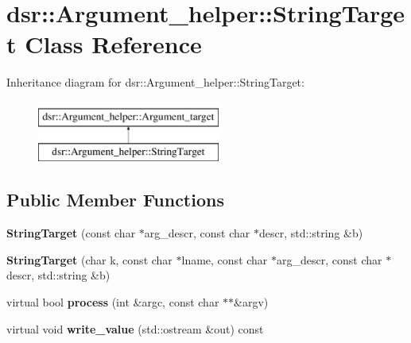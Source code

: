 \hypertarget{classdsr_1_1_argument__helper_1_1_string_target}{
\section{dsr::Argument\_\-helper::StringTarget Class Reference}
\label{classdsr_1_1_argument__helper_1_1_string_target}
}
Inheritance diagram for dsr::Argument\_\-helper::StringTarget:\begin{figure}[H]
\begin{center}
\leavevmode
\includegraphics[height=2.000000cm]{classdsr_1_1_argument__helper_1_1_string_target}
\end{center}
\end{figure}
\subsection*{Public Member Functions}
\begin{DoxyCompactItemize}
\item 
\hypertarget{classdsr_1_1_argument__helper_1_1_string_target_abbaf278629fe7019d9dd5018ab544b64}{
{\bfseries StringTarget} (const char $\ast$arg\_\-descr, const char $\ast$descr, std::string \&b)}
\label{classdsr_1_1_argument__helper_1_1_string_target_abbaf278629fe7019d9dd5018ab544b64}

\item 
\hypertarget{classdsr_1_1_argument__helper_1_1_string_target_a3528a449e48433bc0fab249a02913d8d}{
{\bfseries StringTarget} (char k, const char $\ast$lname, const char $\ast$arg\_\-descr, const char $\ast$descr, std::string \&b)}
\label{classdsr_1_1_argument__helper_1_1_string_target_a3528a449e48433bc0fab249a02913d8d}

\item 
\hypertarget{classdsr_1_1_argument__helper_1_1_string_target_a38a81be4a7d8bf51eefbeb7bd7f38bea}{
virtual bool {\bfseries process} (int \&argc, const char $\ast$$\ast$\&argv)}
\label{classdsr_1_1_argument__helper_1_1_string_target_a38a81be4a7d8bf51eefbeb7bd7f38bea}

\item 
\hypertarget{classdsr_1_1_argument__helper_1_1_string_target_a083f06031c7f4a9408d0ebb7f3a21352}{
virtual void {\bfseries write\_\-value} (std::ostream \&out) const }
\label{classdsr_1_1_argument__helper_1_1_string_target_a083f06031c7f4a9408d0ebb7f3a21352}

\end{DoxyCompactItemize}

